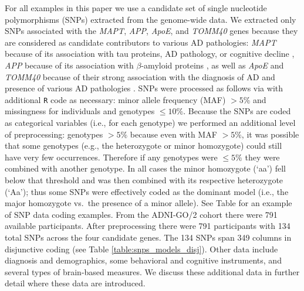 \documentclass[12pt]{article}
\begin{document}
For all examples in this paper we use a candidate set of single
nucleotide polymorphisms (SNPs) extracted from the genome-wide data. We
extracted only SNPs associated with the \textit{MAPT}, \textit{APP},
\textit{ApoE}, and \textit{TOMM40} genes because they are considered as
candidate contributors to various AD pathologies: \textit{MAPT} because
of its association with tau proteins, AD pathology, or cognitive decline
\citep{myers_h1c_2005, trabzuni_mapt_2012, desikan_genetic_2015, cruchaga_rare_2012, peterson_variants_2014},
\textit{APP} because of its association with \(\beta\)-amyloid proteins
\citep{cruchaga_rare_2012, huang_apoe2_2017, jonsson_mutation_2012}, as
well as \textit{ApoE} and \textit{TOMM40} because of their strong
association with the diagnosis of AD and presence of various AD
pathologies
\citep{linnertz_cis-regulatory_2014, roses_tomm40_2010-1, bennet_pleiotropy_2010, huang_apoe2_2017}.
SNPs were processed as follows via \citet{purcell2007plink} with
additional \texttt{R} code as necessary: minor allele frequency (MAF)
\(> 5\%\) and missingness for individuals and genotypes \(\leq 10\%\).
Because the SNPs are coded as categorical variables (i.e., for each
genotype) we performed an additional level of preprocessing: genotypes
\(> 5\%\) because even with MAF \(> 5\%\), it was possible that some
genotypes (e.g., the heterozygote or minor homozygote) could still have
very few occurrences. Therefore if any genotypes were \(\leq 5\%\) they
were combined with another genotype. In all cases the minor homozygote
(`aa') fell below that threshold and was then combined with its
respective heterozygote (`Aa'); thus some SNPs were effectively coded as
the dominant model (i.e., the major homozygote vs.~the presence of a
minor allele). See Table for an example of SNP data coding examples.
From the ADNI-GO/2 cohort there were 791 available participants. After
preprocessing there were 791 participants with 134 total SNPs across the
four candidate genes. The 134 SNPs span 349 columns in disjunctive
coding (see Table \ref{table:snps_models_disj}). Other data include
diagnosis and demographics, some behavioral and cognitive instruments,
and several types of brain-based measures. We discuss these additional
data in further detail where these data are introduced.
\end{document}
